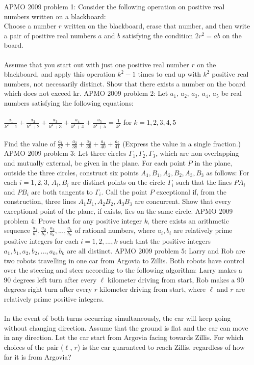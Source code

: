 APMO 2009 problem 1:  Consider the following operation on positive real numbers written on a blackboard: \\
Choose a number $ r$ written on the blackboard, erase that number, and then write a pair of positive real numbers $ a$ and $ b$ satisfying the condition $ 2 r^2 = ab$ on the board. \\\\
Assume that you start out with just one positive real number $ r$ on the blackboard, and apply this operation $ k^2 - 1$ times to end up with $ k^2$ positive real numbers, not necessarily distinct. Show that there exists a number on the board which does not exceed kr. 
APMO 2009 problem 2:  Let $ a_1$, $ a_2$, $ a_3$, $ a_4$, $ a_5$ be real numbers satisfying the following equations: \\\\
$ \frac{a_1}{k^2+1}+\frac{a_2}{k^2+2}+\frac{a_3}{k^2+3}+\frac{a_4}{k^2+4}+\frac{a_5}{k^2+5} = \frac{1}{k^2}$ for $ k = 1, 2, 3, 4, 5$ \\\\
Find the value of $ \frac{a_1}{37}+\frac{a_2}{38}+\frac{a_3}{39}+\frac{a_4}{40}+\frac{a_5}{41}$ (Express the value in a single fraction.) 
APMO 2009 problem 3:  Let three circles $ \Gamma_1, \Gamma_2, \Gamma_3$, which are non-overlapping and mutually external, be given in the plane. For each point $ P$ in the plane, outside the three circles, construct six points $ A_1, B_1, A_2, B_2, A_3, B_3$ as follows: For each $ i = 1, 2, 3$, $ A_i, B_i$ are distinct points on the circle $ \Gamma_i$ such that the lines $ PA_i$ and $ PB_i$ are both tangents to $ \Gamma_i$. Call the point $ P$ exceptional if, from the construction, three lines $ A_1B_1, A_2 B_2, A_3 B_3$ are concurrent. Show that every exceptional point of the plane, if exists, lies on the same circle. 
APMO 2009 problem 4:  Prove that for any positive integer $ k$, there exists an arithmetic sequence $ \frac{a_1}{b_1}, \frac{a_2}{b_2}, \frac{a_3}{b_3}, ... ,\frac{a_k}{b_k}$ of rational numbers, where $ a_i, b_i$ are relatively prime positive integers for each $ i = 1,2,...,k$ such that the positive integers $ a_1, b_1, a_2, b_2, ...,  a_k, b_k$ are all distinct. 
APMO 2009 problem 5:  Larry and Rob are two robots travelling in one car from Argovia to Zillis. Both robots have control over the steering and steer according to the following algorithm: Larry makes a 90 degrees left turn after every $ \ell$ kilometer driving from start, Rob makes a 90 degrees right turn after every $ r$ kilometer driving from start, where $ \ell$ and $ r$ are relatively prime positive integers. \\\\
In the event of both turns occurring simultaneously, the car will keep going without changing direction. Assume that the ground is flat and the car can move in any direction. Let the car start from Argovia facing towards Zillis. For which choices of the pair ($ \ell$, $ r$) is the car guaranteed to reach Zillis, regardless of how far it is from Argovia? 

